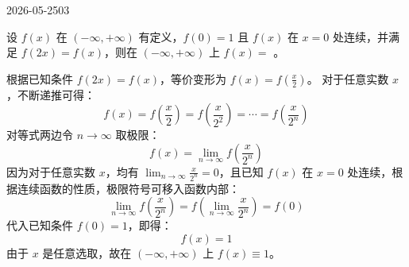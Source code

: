 \begin{mistake}{2026-05-25}{03}

\begin{problemcontent}
设 \( f(x) \) 在 \( (-\infty, +\infty) \) 有定义，\( f(0) = 1 \) 且 \( f(x) \) 在 \( x = 0 \) 处连续，并满足 \( f(2x) = f(x) \)，则在 \( (-\infty, +\infty) \) 上 \( f(x) = \) \underline{ \quad}。
\end{problemcontent}

\begin{solutioncontent}
根据已知条件 \( f(2x) = f(x) \)，等价变形为 \( f(x) = f\left(\frac{x}{2}\right) \)。
对于任意实数 \( x \)，不断递推可得：
\[ f(x) = f\left(\frac{x}{2}\right) = f\left(\frac{x}{2^2}\right) = \cdots = f\left(\frac{x}{2^n}\right) \]
对等式两边令 \( n \to \infty \) 取极限：
\[ f(x) = \lim_{n \to \infty} f\left(\frac{x}{2^n}\right) \]
因为对于任意实数 \( x \)，均有 \( \lim_{n\to\infty} \frac{x}{2^n} = 0 \)，且已知 \( f(x) \) 在 \( x=0 \) 处连续，根据连续函数的性质，极限符号可移入函数内部：
\[ \lim_{n \to \infty} f\left(\frac{x}{2^n}\right) = f\left( \lim_{n \to \infty} \frac{x}{2^n} \right) = f(0) \]
代入已知条件 \( f(0) = 1 \)，即得：
\[ f(x) = 1 \]
由于 \( x \) 是任意选取，故在 \( (-\infty, +\infty) \) 上 \( f(x) \equiv 1 \)。
\end{solutioncontent}


\end{mistake}
